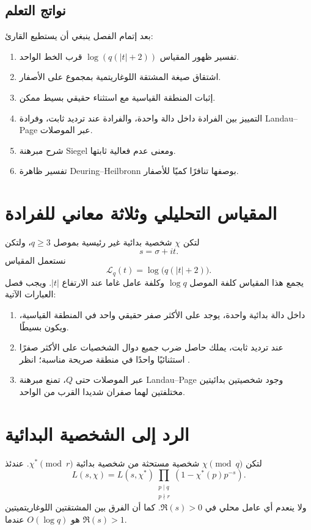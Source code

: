 \subsection{نواتج التعلم}

بعد إتمام الفصل ينبغي أن يستطيع القارئ:
\begin{enumerate}
  \item تفسير ظهور المقياس \(\log(q(|t|+2))\) قرب الخط الواحد.
  \item اشتقاق صيغة المشتقة اللوغاريتمية بمجموع على الأصفار.
  \item إثبات المنطقة القياسية مع استثناء حقيقي بسيط ممكن.
  \item التمييز بين الفرادة داخل دالة واحدة، والفرادة عند ترديد ثابت،
  وفرادة Landau--Page عبر الموصلات.
  \item شرح مبرهنة Siegel ومعنى عدم فعالية ثابتها.
  \item تفسير ظاهرة Deuring--Heilbronn بوصفها تنافرًا كميًا للأصفار.
\end{enumerate}

\section{المقياس التحليلي وثلاثة معاني للفرادة}

لتكن \(\chi\) شخصية بدائية غير رئيسية بموصل \(q\ge3\)، ولتكن
\[
s=\sigma+it.
\]
نستعمل المقياس
\[
\mathcal L_q(t)=\log\bigl(q(|t|+2)\bigr).
\]
يجمع هذا المقياس كلفة الموصل \(\log q\) وكلفة عامل غاما عند الارتفاع
\(|t|\). ويجب فصل العبارات الآتية:
\begin{enumerate}
  \item داخل دالة بدائية واحدة، يوجد على الأكثر صفر حقيقي واحد في المنطقة
  القياسية، ويكون بسيطًا.
  \item عند ترديد ثابت، يملك حاصل ضرب جميع دوال الشخصيات على الأكثر صفرًا
  استثنائيًا واحدًا في منطقة صريحة مناسبة؛ انظر
  \cite{McCurley1984,Kadiri2018}.
  \item عبر الموصلات حتى \(Q\)، تمنع مبرهنة Landau--Page وجود شخصيتين
  بدائيتين مختلفتين لهما صفران شديدا القرب من الواحد.
\end{enumerate}

\section{الرد إلى الشخصية البدائية}

\begin{proposition}
\label{prop:chapter11-primitive-reduction}
\provedhere
لتكن \(\chi\pmod q\) شخصية مستحثة من شخصية بدائية
\(\chi^*\pmod r\). عندئذ
\[
L(s,\chi)=L(s,\chi^*)
\prod_{\substack{p\mid q\\p\nmid r}}
\left(1-\chi^*(p)p^{-s}\right).
\]
ولا ينعدم أي عامل محلي في \(\Re(s)>0\). كما أن الفرق بين المشتقتين
اللوغاريتميتين هو \(O(\log q)\) عندما \(\Re(s)>1\).
\end{proposition}

